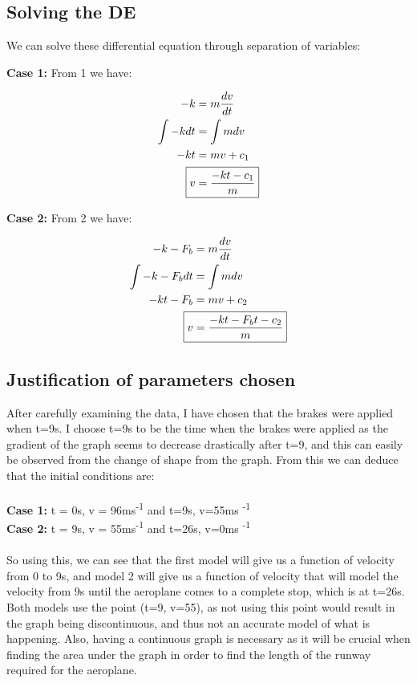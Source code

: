 \subsection{Solving the DE}
We can solve these differential equation through separation of variables:

\textbf{Case 1: }
From 1 we have:

\begin{align*}
    -k &= m \frac{dv}{dt}
    \\ \int -k dt &= \int m dv
    \\ -kt &= mv + c_1
    \\ \Aboxed{v &= \frac{-kt - c_1}{m}}
\end{align*}

\textbf{Case 2:}
From 2 we have: 

\begin{align*}
    -k - F_b &= m \frac{dv}{dt}
    \\ \int -k - F_bdt &= \int mdv
    \\ -kt - F_b &= mv + c_2
    \\ \Aboxed{v &= \frac{-kt-F_bt-c_2}{m}}
\end{align*}

\subsection{Justification of parameters chosen}
After carefully examining the data, I have chosen that the brakes were applied when t=9s. I choose t=9s to be the time when the brakes were applied as the gradient of the graph seems to decrease drastically after t=9, and this can easily be observed from the change of shape from the graph. From this we can deduce that the initial conditions are:
\\ \\
\textbf{Case 1: } t = 0s, v = 96ms\textsuperscript{-1} and t=9s, v=55ms \textsuperscript{-1}
\\
\textbf{Case 2: } t = 9s, v = 55ms\textsuperscript{-1} and t=26s, v=0ms \textsuperscript{-1}
\\ \\
So using this, we can see that the first model will give us a function of velocity from 0 to 9s, and model 2 will give us a function of velocity that will model the velocity from 9s until the aeroplane comes to a complete stop, which is at t=26s. Both models use the point (t=9, v=55), as not using this point would result in the graph being discontinuous, and thus not an accurate model of what is happening. Also, having a continuous graph is necessary as it will be crucial when finding the area under the graph in order to find the length of the runway required for the aeroplane.

